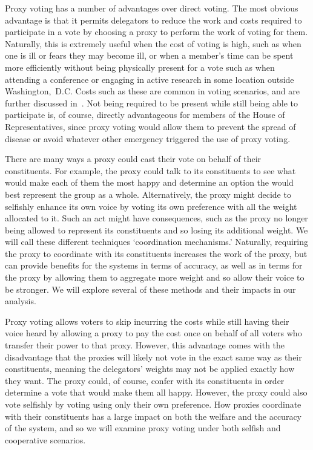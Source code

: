 Proxy voting has a number of advantages over direct voting.
The most obvious advantage is that it permits delegators to reduce the work and costs
required to participate in a vote by choosing a proxy to perform the work of voting
for them.
Naturally, this is extremely useful when the cost of voting is high, such as
when one is ill or fears they may become ill, or when a member's time can be spent
more efficiently without being physically present for a vote such as when attending a
conference or engaging in active research in some location outside {Washington,~D.C}.
Costs such as these are common in voting scenarios, and are further discussed
in~\cite{Gershtein2019}.
Not being required to be present while still being able to participate is, of course,
directly advantageous for members of the House of Representatives, since proxy voting
would allow them to prevent the spread of disease or avoid whatever other emergency
triggered the use of proxy voting.

There are many ways a proxy could cast their vote on behalf of their constituents.
For example, the proxy could talk to its constituents to see what would make each of
them the most happy and determine an option the would best represent the group as a
whole.
Alternatively, the proxy might decide to selfishly enhance its own voice by voting its
own preference with all the weight allocated to it.
Such an act might have consequences, such as the proxy no longer being allowed to
represent its constituents and so losing its additional weight.
We will call these different techniques `coordination mechanisms.'
Naturally, requiring the proxy to coordinate with its constituents increases the work
of the proxy, but can provide benefits for the systems in terms of accuracy, as well
as in terms for the proxy by allowing them to aggregate more weight and so allow
their voice to be stronger.
We will explore several of these methods and their impacts in our analysis.

Proxy voting allows voters to skip incurring the costs while still having their voice
heard by allowing a proxy to pay the cost once on behalf of all voters who transfer
their power to that proxy.
However, this advantage comes with the disadvantage that the proxies will likely not
vote in the exact same way as their constituents, meaning the delegators' weights may
not be applied exactly how they want.
The proxy could, of course, confer with its constituents in order determine a vote
that would make them all happy.
However, the proxy could also vote selfishly by voting using only their own preference.
How proxies coordinate with their constituents has a large impact on both the welfare
and the accuracy of the system, and so we will examine proxy voting under both
selfish and cooperative scenarios.

